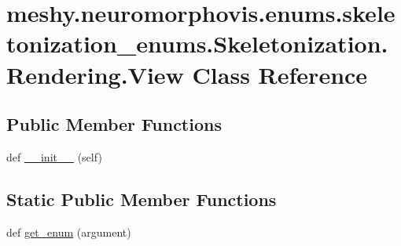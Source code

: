\hypertarget{classmeshy_1_1neuromorphovis_1_1enums_1_1skeletonization__enums_1_1Skeletonization_1_1Rendering_1_1View}{}\section{meshy.\+neuromorphovis.\+enums.\+skeletonization\+\_\+enums.\+Skeletonization.\+Rendering.\+View Class Reference}
\label{classmeshy_1_1neuromorphovis_1_1enums_1_1skeletonization__enums_1_1Skeletonization_1_1Rendering_1_1View}


 


\subsection*{Public Member Functions}
\begin{DoxyCompactItemize}
\item 
def \hyperlink{classmeshy_1_1neuromorphovis_1_1enums_1_1skeletonization__enums_1_1Skeletonization_1_1Rendering_1_1View_a773f89ada51a854c4131bd02a7bbd862}{\+\_\+\+\_\+init\+\_\+\+\_\+} (self)\hypertarget{classmeshy_1_1neuromorphovis_1_1enums_1_1skeletonization__enums_1_1Skeletonization_1_1Rendering_1_1View_a773f89ada51a854c4131bd02a7bbd862}{}\label{classmeshy_1_1neuromorphovis_1_1enums_1_1skeletonization__enums_1_1Skeletonization_1_1Rendering_1_1View_a773f89ada51a854c4131bd02a7bbd862}

\end{DoxyCompactItemize}
\subsection*{Static Public Member Functions}
\begin{DoxyCompactItemize}
\item 
def \hyperlink{classmeshy_1_1neuromorphovis_1_1enums_1_1skeletonization__enums_1_1Skeletonization_1_1Rendering_1_1View_a369ed532fe9db76160569a4476a94f47}{get\+\_\+enum} (argument)\hypertarget{classmeshy_1_1neuromorphovis_1_1enums_1_1skeletonization__enums_1_1Skeletonization_1_1Rendering_1_1View_a369ed532fe9db76160569a4476a94f47}{}\label{classmeshy_1_1neuromorphovis_1_1enums_1_1skeletonization__enums_1_1Skeletonization_1_1Rendering_1_1View_a369ed532fe9db76160569a4476a94f47}

\end{DoxyCompactItemize}
